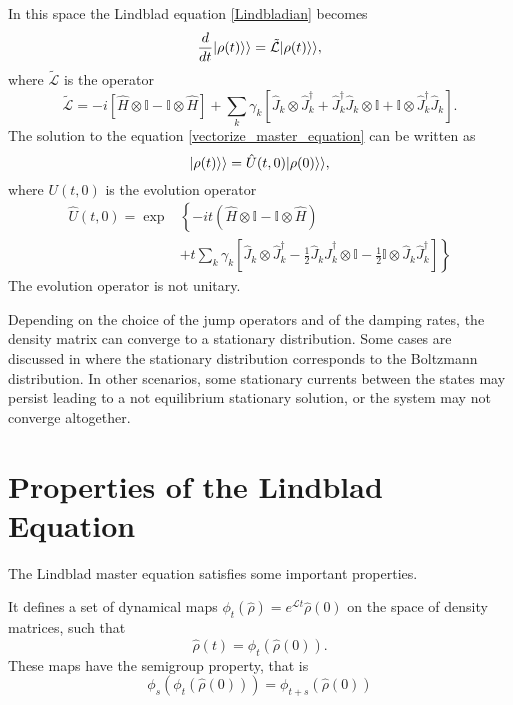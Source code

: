 In this space the Lindblad equation \eqref{Lindbladian} becomes
\begin{equation}\label{vectorize_master_equation}
    \frac{d}{dt}\lvert\rho(t)\rangle\rangle = \tilde{\mathcal{L}}\lvert\rho(t)\rangle\rangle,
\end{equation}
where $\tilde{\mathcal{L}}$ is the operator 
\begin{equation}
    \tilde{\mathcal{L}}=-i\left[\hat H\otimes\mathbb{I}-\mathbb{I}\otimes\hat H\right]+\sum_{k}\gamma_{k}\left[\hat J_{k}\otimes\hat J^\dagger_{k} + \hat J_{k}^\dagger \hat J_{k}\otimes\mathbb{I} +\mathbb{I}\otimes\hat J_{k}^\dagger \hat J_{k}\right].
\end{equation}
The solution to the equation \eqref{vectorize_master_equation} can be written as
\begin{equation}
    \lvert\rho(t)\rangle\rangle = \hat U(t,0)\lvert\rho(0)\rangle\rangle,
\end{equation}
where $U(t,0)$ is the evolution operator
\begin{equation}
    \begin{split}
        \hat U(t,0) = \exp&\left\{-it\left(\hat H\otimes\mathbb{I}-\mathbb{I}\otimes\hat H\right)\phantom{\left[\frac{1}{2}\right]}\right.\\
        &+\left. t\sum_{k}\gamma_{k}\left[\hat J_{k}\otimes\hat J^\dagger_{k}-\frac{1}{2}\hat J_{k}\hat J^\dagger_{k}\otimes\mathbb{I}-\frac{1}{2}\mathbb{I}\otimes\hat J_{k}\hat J^\dagger_{k}\right]\right\}
    \end{split}
\end{equation}
The evolution operator is not unitary.

Depending on the choice of the jump operators and of the damping rates, the density matrix can converge to a stationary distribution.  
Some cases are discussed in \cite{Breuer-Petruccione} where the stationary distribution corresponds to the Boltzmann distribution. 
In other scenarios, some stationary currents between the states may persist leading to a not equilibrium stationary solution, or the system may not converge altogether.

\section{Properties of the Lindblad Equation}
The Lindblad master equation satisfies some important properties.

It defines a set of dynamical maps $\phi_t\left(\hat\rho\right)= e^{\mathcal{L}t}\hat\rho(0)$ on the space of density matrices, such that
\begin{equation}
    \hat\rho(t) = \phi_t\left(\hat\rho(0)\right).
\end{equation}
These maps have the semigroup property, that is
\begin{equation}
    \phi_s\left(\phi_t\left(\hat\rho(0)\right)\right)=\phi_{t+s}\left(\hat\rho(0)\right)
\end{equation}

